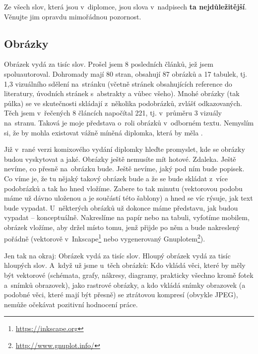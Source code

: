 Ze všech slov, která jsou v~diplomce, jsou slova v~nadpisech \textbf{ta nejdůležitější}. Věnujte jim opravdu mimořádnou pozornost.

\subsection*{Obrázky}
Obrázek vydá za tisíc slov. Prošel jsem 8 posledních článků, jež jsem spoluautoroval. Dohromady mají 80 stran, obsahují 87 obrázků a 17 tabulek, tj. 1,3 vizuálního sdělení na~stránku (včetně stránek obsahujících reference do literatury, úvodních stránek s~abstrakty a vůbec všeho). Mnohé obrázky (tak půlka) se ve skutečnosti skládají z~několika podobrázků, zvlášť odkazovaných. Těch jsem v~řečených 8 článcích napočítal 221, tj. v~průměru 3 vizuály na~stranu. Taková je moje představa o~roli obrázků v~odborném textu. Nemyslím si, že by mohla existovat vážně míněná diplomka, která by měla .

Již v~rané verzi komixového vydání diplomky hleďte promyslet, kde se obrázky budou vyskytovat a jaké. Obrázky ještě nemusíte mít hotové. Zdaleka. Ještě nevíme, co přesně na~obrázku bude. Ještě nevíme, jaký pod ním bude popisek. Co víme je, že tu nějaký takový obrázek bude a že se bude skládat z~více podobrázků a tak ho hned vložíme. Zabere to tak minutu (vektorovou podobu  máme už dávno uloženou a je součástí této šablony) a hned se víc rýsuje, jak text bude vypadat. 
U~některých obrázků už dokonce máme představu, jak budou vypadat -- konceptuálně. Nakreslíme na papír nebo na tabuli, vyfotíme mobilem, obrázek vložíme, aby držel místo tomu, jenž přijde po něm a bude nakreslený pořádně (vektorově v~Inkscape\footnote{\url{https://inkscape.org}} nebo vygenerovaný Gnuplotem\footnote{\url{http://www.gnuplot.info/}}).

Jen tak na okraj: Obrázek vydá za tisíc slov. Hloupý obrázek vydá za tisíc hloupých slov. A~když už jsme u~těch obrázků: Kdo vkládá věci, které by měly být vektorové (schémata, grafy, nákresy, diagramy, prakticky všechno kromě fotek a~snímků obrazovek), jako rastrové obrázky, a kdo vkládá snímky obrazovek (a podobné věci, které mají být přesně) se ztrátovou kompresí (obvykle JPEG), nemůže očekávat pozitivní hodnocení práce.


